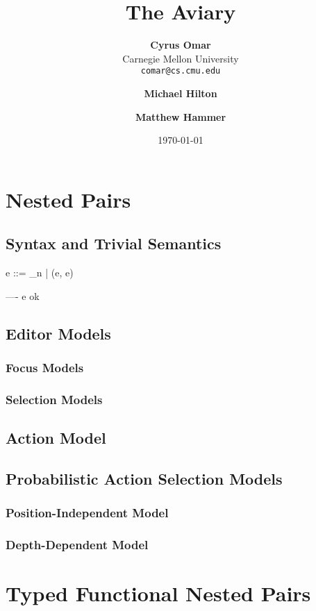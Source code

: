 \documentclass[11pt,leqno]{book}
\title{\textbf{The Aviary}}
\author{
	\textbf{Cyrus Omar}\\
	Carnegie Mellon University\\
	\texttt{comar@cs.cmu.edu}
	\and 
	\textbf{Michael Hilton} 
	\and 
	\textbf{Matthew Hammer}}
\date{\today}
\theoremstyle{definition}
\begin{document}
\hypersetup{pageanchor=false}
\maketitle
\hypersetup{pageanchor=true}




\chapter{Nested Pairs}

\section{Syntax and Trivial Semantics}
e ::= _n | (e, e)

----
e ok

\section{Editor Models}

\subsection{Focus Models}

\subsection{Selection Models}

\section{Action Model}

\section{Probabilistic Action Selection Models}
\subsection{Position-Independent Model}

\subsection{Depth-Dependent Model}

\chapter{Typed Functional Nested Pairs}


%
%
\end{document}
